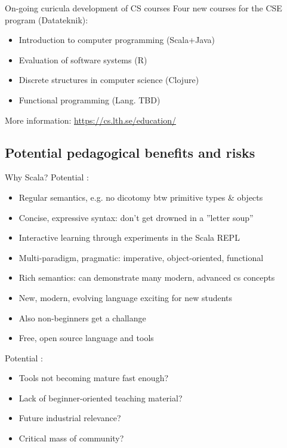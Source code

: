 \documentclass{lecturenotes}
\begin{document}
\begin{Slide}{On-going curicula development of CS courses}
Four new courses for the CSE program (Datateknik):
\begin{itemize}
\item Introduction to computer programming (Scala+Java)
\item Evaluation of software systems (R)
\item Discrete structures in computer science (Clojure)
\item Functional programming (Lang. TBD)
\end{itemize}
\vspace{1em} More information:
\url{https://cs.lth.se/education/}
\end{Slide}

\subsection[Potential pedagogical benefits and risks]{Potential pedagogical benefits and risks}

\begin{Slide}{Why Scala?}
Potential :
\begin{itemize}\fontsize{9}{10}\selectfont
\item Regular semantics, e.g. no dicotomy btw primitive types \& objects
\item Concise, expressive syntax: don't get drowned in a ''letter soup''
\item Interactive learning through experiments in the Scala REPL
\item Multi-paradigm, pragmatic: imperative, object-oriented, functional
\item Rich semantics: can demonstrate many modern, advanced cs concepts
\item New, modern, evolving language exciting for new students
\item Also non-beginners get a challange 
\item Free, open source language and tools
\end{itemize}
Potential :
\begin{itemize}\fontsize{9}{10}\selectfont
\item Tools not becoming mature fast enough?  
\item Lack of beginner-oriented teaching material?
\item Future industrial relevance? 
\item Critical mass of community?
\end{itemize}
\end{Slide}
\end{document}
